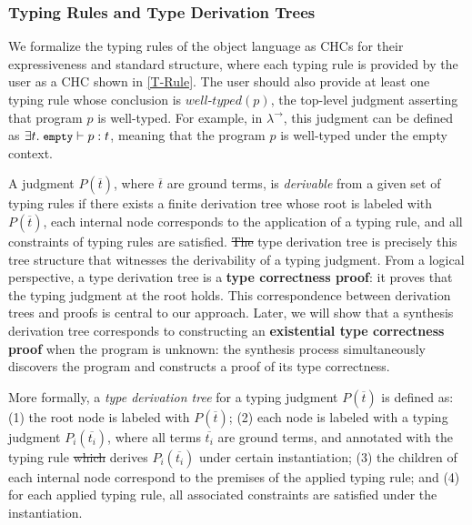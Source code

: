 \documentclass[manuscript,screen]{acmart}
\makeatletter
\newcommand{\stlctype}[3]{{#1} \vdash {#2} : {#3}}
\newcommand{\welltyped}[1]{\mathit{well\text{-}typed}\left(#1\right)}
\newcommand{\tcode}[1]{{\small \texttt{\spaceskip=0.2em #1}}}
\newcommand{\stlc}{\lambda^{\rightarrow}}
\providecommand{\DIFadd}[1]{{\protect\color{blue}\uwave{#1}}} %
\providecommand{\DIFdel}[1]{{\protect\color{red}\sout{#1}}} %
\providecommand{\DIFaddbegin}{} %
\providecommand{\DIFaddend}{} %
\providecommand{\DIFdelbegin}{} %
\providecommand{\DIFdelend}{} %
\providecommand{\DIFscaledelfig}{0.5}
\newlength{\DIFdelgraphicswidth} %
\newlength{\DIFdelgraphicsheight} %
\providecommand{\DIFaddincludegraphics}[2][]{{\color{blue}\fbox{\DIFOincludegraphics[#1]{#2}}}} %
\providecommand{\DIFdelincludegraphics}[2][]{%
\sbox{\DIFdelgraphicsbox}{\DIFOincludegraphics[#1]{#2}}%
\settoboxwidth{\DIFdelgraphicswidth}{\DIFdelgraphicsbox} %
\settoboxtotalheight{\DIFdelgraphicsheight}{\DIFdelgraphicsbox} %
\scalebox{\DIFscaledelfig}{%
\parbox[b]{\DIFdelgraphicswidth}{\usebox{\DIFdelgraphicsbox}\\[-\baselineskip] \rule{\DIFdelgraphicswidth}{0em}}\llap{\resizebox{\DIFdelgraphicswidth}{\DIFdelgraphicsheight}{%
\setlength{\unitlength}{\DIFdelgraphicswidth}%
\begin{picture}(1,1)%
\thicklines\linethickness{2pt} %
{\color[rgb]{1,0,0}\put(0,0){\framebox(1,1){}}}%
{\color[rgb]{1,0,0}\put(0,0){\line( 1,1){1}}}%
{\color[rgb]{1,0,0}\put(0,1){\line(1,-1){1}}}%
\end{picture}%
}\hspace*{3pt}}} %
} %
\DeclareRobustCommand{\DIFaddbegin}{\DIFOaddbegin \let\includegraphics\DIFaddincludegraphics} %
\DeclareRobustCommand{\DIFaddend}{\DIFOaddend \let\includegraphics\DIFOincludegraphics} %
\DeclareRobustCommand{\DIFdelbegin}{\DIFOdelbegin \let\includegraphics\DIFdelincludegraphics} %
\DeclareRobustCommand{\DIFdelend}{\DIFOaddend \let\includegraphics\DIFOincludegraphics} %
\let\sout@orig\sout %
\renewcommand{\sout}[1]{\ifmmode\text{\sout@orig{\ensuremath{#1}}}\else\sout@orig{#1}\fi} %
\makeatother
\begin{document}
\subsubsection{Typing Rules and Type Derivation Trees}
We formalize the typing rules of the object language as CHCs for their expressiveness and standard structure, where each typing rule is provided by the user as a CHC shown in \autoref{T-Rule}.
%
The user should also provide at least one typing rule whose conclusion is $\welltyped{p}$, the top-level judgment asserting that program $p$ is well-typed. For example, in $\stlc$, this judgment can be defined as $\exists t.\; \stlctype{\tcode{empty}}{p}{t}$, meaning that the program $p$ is well-typed under the empty context.

A judgment $P(\overline{t})$, where $\overline{t}$ are ground terms, is \emph{derivable} from a given set of typing rules if there exists a finite derivation tree whose root is labeled with $P(\overline{t})$, each internal node corresponds to the application of a typing rule, and all constraints of typing rules are satisfied. \DIFdelbegin \DIFdel{The }\DIFdelend \DIFaddbegin \DIFadd{A }\DIFaddend type derivation tree is precisely this tree structure that witnesses the derivability of a typing judgment.
%
From a logical perspective, a type derivation tree is a \textbf{type correctness proof}: it proves that the typing judgment at the root holds. This correspondence between derivation trees and proofs is central to our approach. Later, we will show that a synthesis derivation tree corresponds to constructing an \textbf{existential type correctness proof} when the program is unknown: the synthesis process simultaneously discovers the program and constructs a proof of its type correctness.

More formally, a \emph{type derivation tree} for a typing judgment $P(\overline{t})$ is defined as: (1) the root node is labeled with $P(\overline{t})$; (2) each node is labeled with a typing judgment $P_i(\overline{t_i})$, where all terms $\overline{t_i}$ are ground terms, and annotated with the typing rule \DIFdelbegin \DIFdel{which }\DIFdelend \DIFaddbegin \DIFadd{that }\DIFaddend derives $P_i(\overline{t_i})$ under \DIFaddbegin \DIFadd{a }\DIFaddend certain instantiation; (3) the children of each internal node correspond to the premises of the applied typing rule; and (4) for each applied typing rule, all associated constraints are satisfied under the instantiation.
\end{document}
